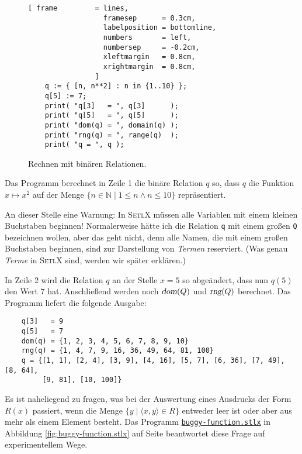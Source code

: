 \begin{figure}[!ht]
  \centering
\begin{Verbatim}[ frame         = lines, 
                  framesep      = 0.3cm, 
                  labelposition = bottomline,
                  numbers       = left,
                  numbersep     = -0.2cm,
                  xleftmargin   = 0.8cm,
                  xrightmargin  = 0.8cm,
                ]
    q := { [n, n**2] : n in {1..10} };
    q[5] := 7;
    print( "q[3]   = ", q[3]      );
    print( "q[5]   = ", q[5]      );
    print( "dom(q) = ", domain(q) );
    print( "rng(q) = ", range(q)  );
    print( "q = ", q );
\end{Verbatim} 
\vspace*{-0.3cm}
\caption{Rechnen mit binären Relationen.}  \label{fig:function.stlx}
\end{figure} %

\noindent
Das Programm berechnet in Zeile 1 die binäre Relation $q$ so, dass $q$ die
Funktion $x \mapsto x^2$ auf der Menge $\{n\in \mathbb{N} \mid 1 \leq n \wedge n \leq 10 \}$
repräsentiert.  

An dieser Stelle eine Warnung: In \textsc{SetlX} müssen alle Variablen mit einem kleinen
Buchstaben beginnen!  Normalerweise hätte ich die Relation \texttt{q} mit einem großen
\texttt{Q} bezeichnen wollen, aber das geht nicht, denn alle Namen, die mit einem großen
Buchstaben beginnen, sind zur Darstellung von \emph{Termen} reserviert.  (Was genau \emph{Terme} in
\textsc{SetlX} sind, werden wir später erklären.)

In Zeile 2 wird die Relation $q$ an der Stelle $x=5$ so abgeändert, dass nun $q(5)$ den Wert
$7$ hat.   Anschließend werden noch $\textsl{dom}(Q)$ und $\textsl{rng}(Q)$ berechnet.
Das Programm liefert die folgende Ausgabe:
\begin{verbatim}
    q[3]   = 9
    q[5]   = 7
    dom(q) = {1, 2, 3, 4, 5, 6, 7, 8, 9, 10}
    rng(q) = {1, 4, 7, 9, 16, 36, 49, 64, 81, 100}
    q = {[1, 1], [2, 4], [3, 9], [4, 16], [5, 7], [6, 36], [7, 49], [8, 64], 
         [9, 81], [10, 100]}
\end{verbatim}

Es ist naheliegend zu fragen, was bei der Auswertung eines Ausdrucks der Form
$R(x)$ passiert, wenn die Menge $\{ y \mid \langle x, y \rangle \in R \}$
entweder leer ist oder aber aus mehr als einem Element besteht. 
Das Programm 
\href{https://github.com/karlstroetmann/Logik/blob/master/SetlX/buggy-function.stlx}{\texttt{buggy-function.stlx}}
in Abbildung
\ref{fig:buggy-function.stlx} auf Seite \pageref{fig:buggy-function.stlx} beantwortet
diese Frage auf experimentellem Wege.

